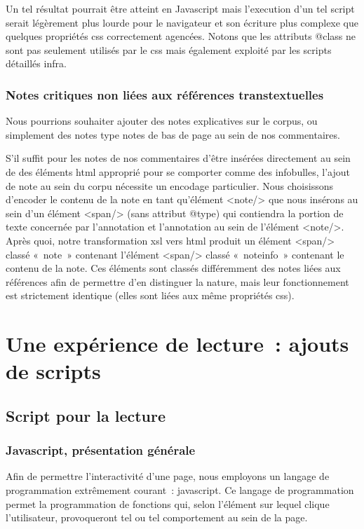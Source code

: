 \documentclass[12pt, a4paper]{article}
\begin{document}
Un tel résultat pourrait être atteint en Javascript mais l'execution d'un tel script serait légèrement plus lourde pour le navigateur et son écriture plus complexe que quelques propriétés css correctement agencées. Notons que les attributs @class ne sont pas seulement utilisés par le css mais également exploité par les scripts détaillés infra.

\subsubsection{Notes critiques non liées aux références transtextuelles}

Nous pourrions souhaiter ajouter des notes explicatives sur le corpus, ou simplement des notes type notes de bas de page au sein de nos commentaires.

S'il suffit pour les notes de nos commentaires d'être insérées directement au sein de des éléments html approprié pour se comporter comme des infobulles, l'ajout de note au sein du corpu nécessite un encodage particulier. Nous choisissons d'encoder le contenu de la note en tant qu'élément <note/> que nous insérons au sein d'un élément <span/> (sans attribut @type) qui contiendra la portion de texte concernée par l'annotation et l'annotation au sein de l'élément <note/>. Après quoi, notre transformation xsl vers html produit un élément <span/> classé « note » contenant l'élément <span/> classé « noteinfo » contenant le contenu de la note. Ces éléments sont classés différemment des notes liées aux références afin de permettre d'en distinguer la nature, mais leur fonctionnement est strictement identique (elles sont liées aux même propriétés css).





\section{Une expérience de lecture~: ajouts de scripts}
\label{js}
    \subsection{Script pour la lecture}

\subsubsection{Javascript, présentation générale}
Afin de permettre l'interactivité d'une page, nous employons un langage de programmation extrêmement courant~: javascript. Ce langage de programmation permet la programmation de fonctions qui, selon l'élément sur lequel clique l'utilisateur, provoqueront tel ou tel comportement au sein de la page.
\end{document}
